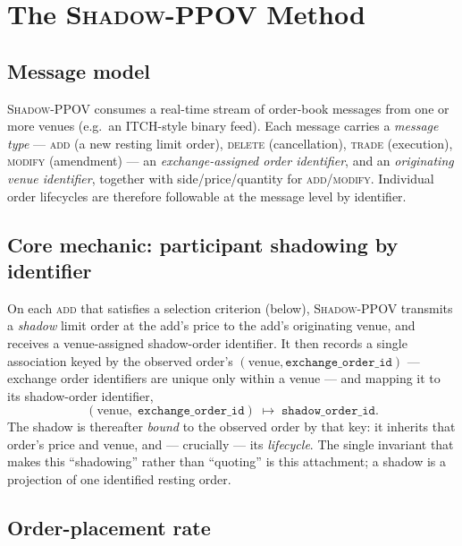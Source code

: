 \documentclass[11pt]{article}
\newcommand{\pov}{\textsc{Shadow-PPOV}}
\begin{document}
\section{The \pov{} Method}
\label{sec:algo}

\subsection{Message model}

\pov{} consumes a real-time stream of order-book messages from one or more
venues (e.g.\ an ITCH-style binary feed). Each message carries a
\emph{message type} --- \textsc{add} (a new resting limit order),
\textsc{delete} (cancellation), \textsc{trade} (execution), \textsc{modify}
(amendment) --- an \emph{exchange-assigned order identifier}, and an
\emph{originating venue identifier}, together with side/price/quantity for
\textsc{add}/\textsc{modify}. Individual order lifecycles are therefore
followable at the message level by identifier.

\subsection{Core mechanic: participant shadowing by identifier}

On each \textsc{add} that satisfies a selection criterion (below), \pov{}
transmits a \emph{shadow} limit order at the add's price to the add's
originating venue, and receives a venue-assigned shadow-order identifier. It
then records a single association keyed by the observed order's
$(\text{venue},\texttt{exchange\_order\_id})$ --- exchange order identifiers are
unique only within a venue --- and mapping it to its shadow-order identifier,
\[
  (\text{venue},\;\texttt{exchange\_order\_id}) \;\longmapsto\; \texttt{shadow\_order\_id}.
\]
The shadow is thereafter \emph{bound} to the
observed order by that key: it inherits that order's price and venue, and ---
crucially --- its \emph{lifecycle}. The single invariant that makes this
``shadowing'' rather than ``quoting'' is this attachment; a shadow is a
projection of one identified resting order.

\subsection{Order-placement rate}
\label{sec:select}
\end{document}
